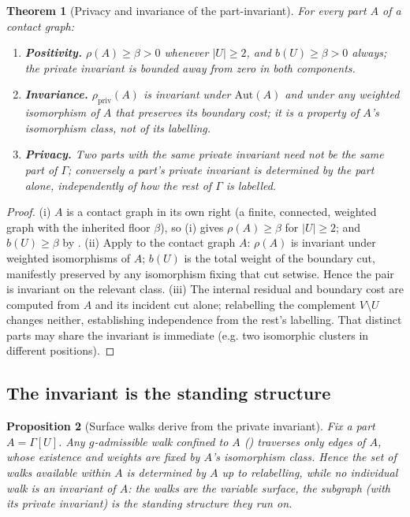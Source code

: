 \documentclass[11pt,a4paper]{article}
\theoremstyle{thmstyle}
\newtheorem{theorem}{Theorem}[section]
\newtheorem{proposition}[theorem]{Proposition}
\theoremstyle{definition}
\theoremstyle{remark}
\newcommand{\Gph}{\Gamma}                 %
\newcommand{\V}{V}                        %
\newcommand{\floorc}{\beta}               %
\newcommand{\gate}{g}                     %
\newcommand{\Agent}{A}                    %
\newcommand{\Res}{\rho}                   %
\newcommand{\abs}[1]{\lvert#1\rvert}
\begin{document}
\begin{theorem}[Privacy and invariance of the part-invariant]
\label{thm:private}
For every part $\Agent$ of a contact graph:
\begin{enumerate}[label=\textup{(\roman*)},leftmargin=2.2em]
\item \textbf{Positivity.} $\Res(\Agent)\ge\floorc>0$ whenever $\abs{U}\ge2$,
and $b(U)\ge\floorc>0$ always; the private invariant is bounded away from zero in
both components.
\item \textbf{Invariance.} $\Res_{\mathrm{priv}}(\Agent)$ is invariant under
$\mathrm{Aut}(\Agent)$ and under any weighted isomorphism of $\Agent$ that
preserves its boundary cost; it is a property of $\Agent$'s isomorphism class,
not of its labelling.
\item \textbf{Privacy.} Two parts with the same private invariant need not be the
same part of $\Gph$; conversely a part's private invariant is determined by the
part alone, independently of how the rest of $\Gph$ is labelled.
\end{enumerate}
\end{theorem}

\begin{proof}
(i) $\Agent$ is a contact graph in its own right (a finite, connected, weighted
graph with the inherited floor $\floorc$), so (i) gives
$\Res(\Agent)\ge\floorc$ for $\abs{U}\ge2$; and $b(U)\ge\floorc$ by
. (ii) Apply  to the contact graph
$\Agent$: $\Res(\Agent)$ is invariant under weighted isomorphisms of $\Agent$;
$b(U)$ is the total weight of the boundary cut, manifestly preserved by any
isomorphism fixing that cut setwise. Hence the pair is invariant on the relevant
class. (iii) The internal residual and boundary cost are computed from $\Agent$
and its incident cut alone; relabelling the complement $\V\setminus U$ changes
neither, establishing independence from the rest's labelling. That distinct parts
may share the invariant is immediate (e.g. two isomorphic clusters in different
positions).
\end{proof}

\subsection{The invariant is the standing structure}

\begin{proposition}[Surface walks derive from the private invariant]
\label{prop:surface-derives}
Fix a part $\Agent=\Gph[U]$. Any $\gate$-admissible walk confined to $\Agent$
\textup{(}\textup{)} traverses only edges of $\Agent$,
whose existence and weights are fixed by $\Agent$'s isomorphism class. Hence the
set of walks available within $\Agent$ is determined by $\Agent$ up to
relabelling, while no individual walk is an invariant of $\Agent$: the walks are
the variable surface, the subgraph \textup{(}with its private invariant\textup{)}
is the standing structure they run on.
\end{proposition}
\end{document}
